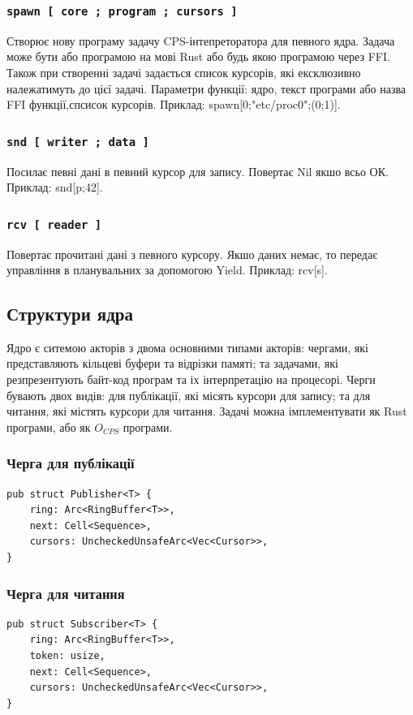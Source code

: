 \subsubsection*{\lstinline{spawn [ core ; program ; cursors ]}}
Створює нову програму задачу CPS-інтепреторатора для певного ядра.
Задача може бути або програмою на мові Rust або будь якою програмою через FFI.
Також при створенні задачі задається список курсорів,
які ексклюзивно належатимуть до цієї задачі.
Параметри функції: ядро, текст програми або назва FFI функції,спсисок курсорів.
Приклад: spawn[0;"etc/proc0";(0;1)].

\subsubsection*{\lstinline{snd [ writer ; data ]}}
Посилає певні дані в певний курсор для запису. Повертає Nil якшо всьо ОК.
Приклад: snd[p;42].

\subsubsection*{\lstinline{rcv [ reader ]}}
Повертає прочитані дані з певного курсору.
Якшо даних немає, то передає управління в планувальних за допомогою Yield.
Приклад: rcv[s].

\subsection{Структури ядра}
Ядро є ситемою акторів з двома основними типами акторів:
чергами, які представляють кільцеві буфери та відрізки памяті;
та задачами, які резпрезентують байт-код програм та іх інтерпретацію на процесорі.
Черги бувають двох видів: для публікації, які місять курсори для запису;
та для читання, які містять курсори для читання. Задачі можна імплементувати
як Rust програми, або як $O_{CPS}$ програми.

\subsubsection{Черга для публікації}
\begin{lstlisting}
pub struct Publisher<T> {
    ring: Arc<RingBuffer<T>>,
    next: Cell<Sequence>,
    cursors: UncheckedUnsafeArc<Vec<Cursor>>,
}
\end{lstlisting}

\subsubsection{Черга для читання}
\begin{lstlisting}
pub struct Subscriber<T> {
    ring: Arc<RingBuffer<T>>,
    token: usize,
    next: Cell<Sequence>,
    cursors: UncheckedUnsafeArc<Vec<Cursor>>,
}
\end{lstlisting}

